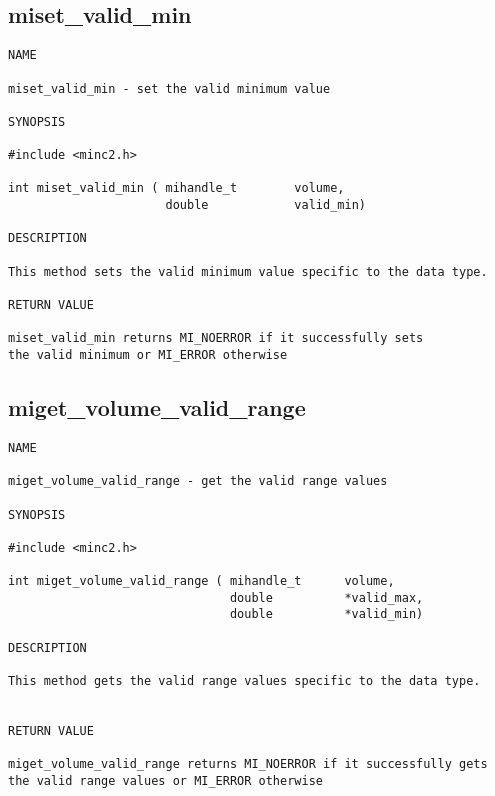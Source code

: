 \documentclass{article}
\begin{document}
\subsection{miset\_valid\_min}
\begin{verbatim}
NAME 

miset_valid_min - set the valid minimum value 

SYNOPSIS

#include <minc2.h>

int miset_valid_min ( mihandle_t        volume,
                      double            valid_min)
                                
DESCRIPTION

This method sets the valid minimum value specific to the data type.

RETURN VALUE

miset_valid_min returns MI_NOERROR if it successfully sets 
the valid minimum or MI_ERROR otherwise
\end{verbatim}

\subsection{miget\_volume\_valid\_range}
\begin{verbatim}
NAME 

miget_volume_valid_range - get the valid range values

SYNOPSIS

#include <minc2.h>

int miget_volume_valid_range ( mihandle_t      volume,
                               double          *valid_max,
                               double          *valid_min)
                                
DESCRIPTION

This method gets the valid range values specific to the data type.


RETURN VALUE

miget_volume_valid_range returns MI_NOERROR if it successfully gets 
the valid range values or MI_ERROR otherwise
\end{verbatim}
\end{document}
